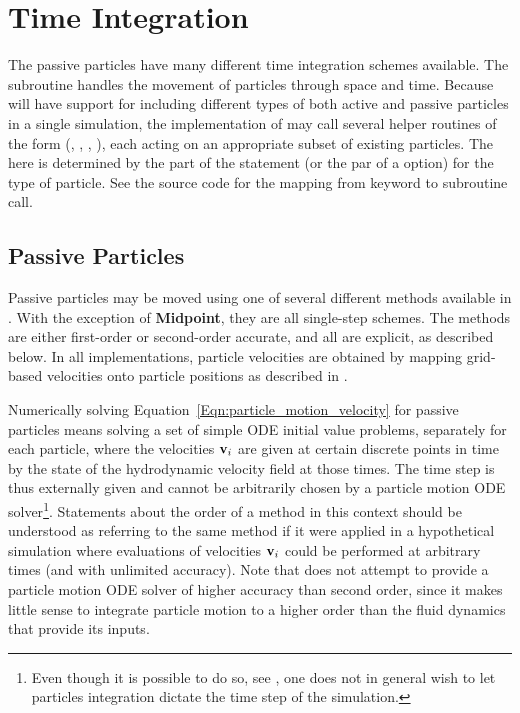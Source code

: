 \section{Time Integration}
\label{Sec:Particles Integration}

The passive particles have many different time
integration schemes available. 
The subroutine
 handles the 
movement of particles through space and time. 
Because \flashx will have support for including different types of both active
and passive particles in a single simulation, the implementation of
 may call several
helper routines of the form  (\eg,
, , ),
each acting on an appropriate subset of existing particles.
The  here is determined by the  part of the
  statement (or the
 par of a  \setup option) for the type of particle. 
See the  source code for the mapping from 
 keyword to  subroutine call.


\subsection{Passive Particles}
\label{Sec:Passive Partices Integration}
Passive particles may be moved using one of several different methods
available in \flashx. With the exception of \textbf{Midpoint},
they are all single-step schemes. The methods are either first-order
or second-order accurate, and all are explicit, as described below.
In all implementations,
particle velocities are obtained by mapping grid-based velocities onto
particle positions as described in .

Numerically solving Equation~\eqref{Eqn:particle_motion_velocity} for passive particles
means solving a set of simple ODE initial value problems, separately for each particle,
where the velocities ${\bf v}_i$ are given at certain discrete points in time
by the state of the hydrodynamic velocity field at those times.
The time step is thus externally given and cannot be arbitrarily chosen by
a particle motion ODE solver\footnote{Even though it is possible to do so, see , one does not in general wish to let particles integration dictate the time step of the simulation.}. Statements about the order of a method in this context should
be understood as referring to the same method if it were applied in a hypothetical
simulation where evaluations of velocities ${\bf v}_i$ could be performed at
arbitrary times (and with unlimited accuracy). Note that \flashx does not
attempt to provide a particle motion ODE solver of higher accuracy than second order,
since it makes little sense to integrate particle motion to a higher order
than the fluid dynamics that provide its inputs.

